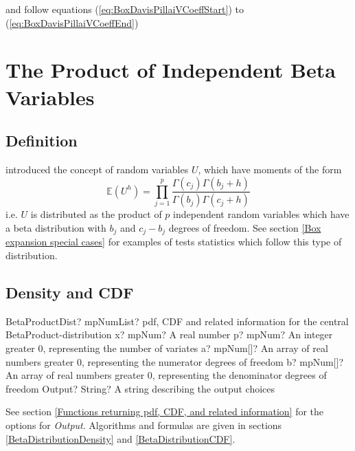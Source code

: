 and follow equations (\ref{eq:BoxDavisPillaiVCoeffStart}) to (\ref{eq:BoxDavisPillaiVCoeffEnd})





\newpage
\section{The Product of Independent Beta Variables}
\label{BetaProductDistribution}


\subsection{Definition}
\label{BetaProductDistributionDistributionDefinition}

\cite{Wilks_1932} introduced the concept of random  variables $U$, which have moments of the form
\begin{equation}
	\mathbb{E}(U^h) = \prod_{j=1}^p \frac{\Gamma(c_j)\Gamma(b_j +h)}{\Gamma(b_j)\Gamma(c_j+h)}
\end{equation}
i.e. $U$ is distributed as the product of $p$ independent random variables which have a beta distribution with $b_j$ and $c_j-b_j$ degrees of freedom.
See section \ref{Box expansion special cases} for examples of tests statistics which follow this type of distribution.



\subsection{Density and CDF}

\begin{mpFunctionsExtract}
	\mpFunctionFiveNotImplemented
	{BetaProductDist? mpNumList? pdf, CDF and related information for the central BetaProduct-distribution}
	{x? mpNum? A real number}
	{p? mpNum? An integer greater 0, representing the number of variates}
	{a? mpNum[]? An array of real numbers greater 0, representing the numerator  degrees of freedom}
	{b? mpNum[]? An array of real numbers greater 0, representing the denominator degrees of freedom}
	{Output? String? A string describing the output choices}
\end{mpFunctionsExtract}


\vspace{0.3cm}
See section \ref{Functions returning pdf, CDF, and related information} for the options for {\itshape\sffamily Output}. Algorithms and formulas are given in sections \ref{BetaDistributionDensity} and \ref{BetaDistributionCDF}.



